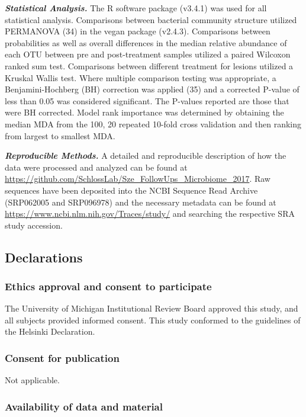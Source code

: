 \documentclass[12pt,]{article}
\begin{document}
\textbf{\emph{Statistical Analysis.}} The R software package (v3.4.1)
was used for all statistical analysis. Comparisons between bacterial
community structure utilized PERMANOVA (34) in the vegan package
(v2.4.3). Comparisons between probabilities as well as overall
differences in the median relative abundance of each OTU between pre and
post-treatment samples utilized a paired Wilcoxon ranked sum test.
Comparisons between different treatment for lesions utilized a Kruskal
Wallis test. Where multiple comparison testing was appropriate, a
Benjamini-Hochberg (BH) correction was applied (35) and a corrected
P-value of less than 0.05 was considered significant. The P-values
reported are those that were BH corrected. Model rank importance was
determined by obtaining the median MDA from the 100, 20 repeated 10-fold
cross validation and then ranking from largest to smallest MDA.

\textbf{\emph{Reproducible Methods.}} A detailed and reproducible
description of how the data were processed and analyzed can be found at
\url{https://github.com/SchlossLab/Sze_FollowUps_Microbiome_2017}. Raw
sequences have been deposited into the NCBI Sequence Read Archive
(SRP062005 and SRP096978) and the necessary metadata can be found at
\url{https://www.ncbi.nlm.nih.gov/Traces/study/} and searching the
respective SRA study accession.

\newpage

\subsection{Declarations}\label{declarations}

\subsubsection{Ethics approval and consent to
participate}\label{ethics-approval-and-consent-to-participate}

The University of Michigan Institutional Review Board approved this
study, and all subjects provided informed consent. This study conformed
to the guidelines of the Helsinki Declaration.

\subsubsection{Consent for publication}\label{consent-for-publication}

Not applicable.

\subsubsection{Availability of data and
material}\label{availability-of-data-and-material}
\end{document}
